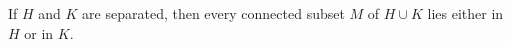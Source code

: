 If $H$ and $K$ are separated, then every connected subset $M$ of $H \cup K$ lies either in $H$ or in $K$.
